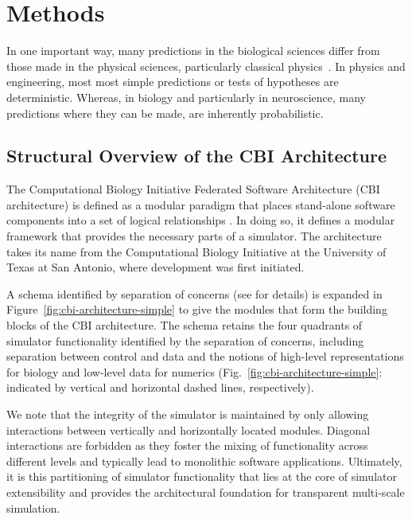 \documentclass{article}
\begin{document}
\section{Methods}

In one important way, many predictions in the biological sciences differ from those made in the physical sciences, particularly classical physics~\cite{darwin71}. In physics and engineering, most most simple predictions or tests of hypotheses are deterministic. Whereas, in biology and particularly in neuroscience, many predictions where they can be made, are inherently probabilistic.

\subsection{Structural Overview of the CBI Architecture}
\label{subsection:CBI-architecture}

The Computational Biology Initiative Federated Software Architecture (CBI architecture) is defined as a modular paradigm that places
stand-alone software components into a set of logical relationships \cite{10.1371/journal.pone.0028956}.
In doing so, it defines a modular framework that provides the
necessary parts of a simulator. The architecture takes its name from the Computational Biology Initiative at the University of Texas at San Antonio, where development was first initiated.

A schema identified by separation of concerns (see
 \cite{10.1371/journal.pone.0028956} for details) is expanded in
Figure~\ref{fig:cbi-architecture-simple} to give the modules that
form the building blocks of the CBI architecture.  The schema retains
the four quadrants of simulator functionality identified by the
separation of concerns, including separation between control and data 
and the notions of high-level representations for biology and low-level data for
numerics (Fig.~\ref{fig:cbi-architecture-simple}: indicated by vertical and
horizontal dashed lines, respectively).

We note that the integrity of the simulator is maintained by only allowing interactions between vertically and horizontally located modules. Diagonal interactions are forbidden as they foster the mixing of functionality across different levels and typically lead to monolithic software applications. Ultimately, it is this partitioning of simulator functionality that lies at the core of simulator extensibility and provides the architectural foundation for transparent multi-scale simulation.
\end{document}
